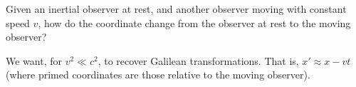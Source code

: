 
Given an inertial observer at rest, and another observer moving with
constant speed $v$, how do the coordinate change from the observer at
rest to the moving observer?

We want, for $v^{2}\ll c^{2}$, to recover Galilean transformations. That
is, $x' \approx x - vt$ (where primed coordinates are those relative to
the moving observer).

